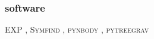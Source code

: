\documentclass[twocolumn, linenumbers]{openjournal}
\begin{document}
\begin{acknowledgments}

\end{acknowledgments}

%

\vspace{5mm}

\subsubsection*{software}
\textsc{EXP} \citep{EXP}, \textsc{Symfind} \citep{mansfield2023symfind}, \textsc{pynbody}
\citep{Pontzen2013}, \textsc{pytreegrav} \citep{Grudic2021}


\end{document}
